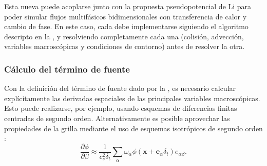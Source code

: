 Esta nueva \lbe{} puede acoplarse junto con la propuesta pseudopotencial de Li para poder simular flujos multif\'asicos bidimensionales con transferencia de calor y cambio de fase. En este caso, cada \lbe{} debe implementarse siguiendo el algoritmo descripto en la , y resolviendo completamente cada una (colisi\'on, advecci\'on, variables macrosc\'opicas y condiciones de contorno) antes de resolver la otra.


\subsubsection{C\'alculo del t\'ermino de fuente}

Con la definici\'on del t\'ermino de fuente dado por la , es necesario calcular expl\'icitamente las derivadas espaciales de las principales variables macrosc\'opicas. Esto puede realizarse, por ejemplo, usando esquemas de diferencias finitas centradas de segundo orden. Alternativamente es posible aprovechar las propiedades de la grilla mediante el uso de esquemas isotr\'opicos de segundo orden \cite{lee_stable_2005}:
\begin{equation}
	\dfrac{\partial \phi}{\partial \beta} \approx \dfrac{1}{c_s^2 \delta_t} \sum_{\alpha} \omega_{\alpha} \phi(\bm{x} + \bm{e}_{\alpha}\delta_t)e_{\alpha\beta}.
\end{equation}

